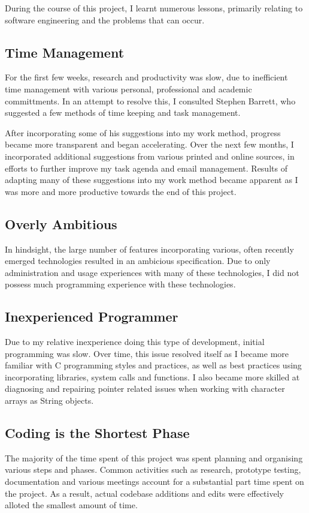 
During the course of this project, I learnt numerous lessons, primarily
relating to software engineering and the problems that can occur.

\subsection{Time Management}

For the first few weeks, research and productivity was slow, due to
inefficient time management with various personal, professional and
academic committments. In an attempt to resolve this, I consulted
Stephen Barrett, who suggested a few methods of time keeping and task
management.


After incorporating some of his suggestions into my work method,
progress became more transparent and began accelerating. Over the next
few months, I incorporated additional suggestions from various printed
and online sources, in efforts to further improve my task agenda and 
email management. Results of adapting many of these suggestions into my
work method became apparent as I was more and more productive towards
the end of this project.

\subsection{Overly Ambitious}

In hindsight, the large number of features incorporating various, often
recently emerged technologies resulted in an ambicious specification.
Due to only administration and usage experiences with many of these
technologies, I did not possess much  programming experience with these
technologies. 

\subsection{Inexperienced Programmer}

Due to my relative inexperience doing this type of development, initial
programming was slow. Over time, this issue resolved itself as I became
more familiar with C programming styles and practices, as well as best
practices using incorporating libraries, system calls and functions. I
also became more skilled at diagnosing and repairing pointer related 
issues when working with character arrays as String objects.

\subsection{Coding is the Shortest Phase}

The majority of the time spent of this project was spent planning and
organising various steps and phases. Common activities such as research,
prototype testing, documentation and various meetings account for a 
substantial part time spent on the project. As a result, actual codebase
additions and edits were effectively alloted the smallest amount of
time.


